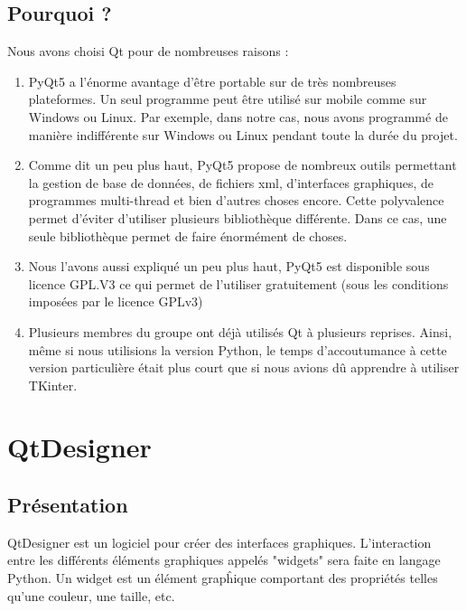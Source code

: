 {\subsection{Pourquoi ?}

Nous avons choisi Qt pour de nombreuses raisons :
\begin{enumerate}
    \item {}\newline PyQt5 a l'énorme avantage d'être portable sur de très nombreuses plateformes. Un seul programme peut être utilisé sur mobile comme sur Windows ou Linux.\newline
    Par exemple, dans notre cas, nous avons programmé de manière indifférente sur Windows ou Linux pendant toute la durée du projet.
    
    \item {}\newline Comme dit un peu plus haut, PyQt5 propose de nombreux outils permettant la gestion de base de données, de fichiers xml, d'interfaces graphiques, de programmes multi-thread et bien d'autres choses encore. Cette polyvalence permet d'éviter d'utiliser plusieurs bibliothèque différente. Dans ce cas, une seule bibliothèque permet de faire énormément de choses.
    
    \item {}\newline Nous l'avons aussi expliqué un peu plus haut, PyQt5 est disponible sous licence GPL.V3 ce qui permet de l'utiliser gratuitement (sous les conditions imposées par le licence GPLv3)
    
    \item {}\newline Plusieurs membres du groupe ont déjà utilisés Qt à plusieurs reprises. Ainsi, même si nous utilisions la version Python, le temps d'accoutumance à cette version particulière était plus court que si nous avions dû apprendre à utiliser TKinter.
\end{enumerate}

\section{QtDesigner}

\subsection{Présentation}
QtDesigner est un logiciel pour créer des interfaces graphiques.\newline
L'interaction entre les différents éléments graphiques appelés "widgets" sera faite en langage Python. 
Un widget est un élément grapĥique comportant des propriétés telles qu'une couleur, une taille, etc. \newline \newline


}
